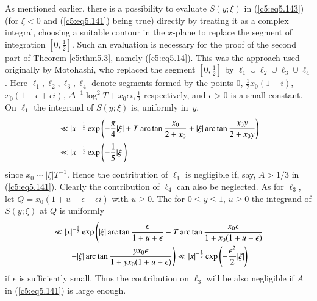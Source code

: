 As mentioned earlier, there is a possibility to evaluate $S(y;\xi)$ in
(\ref{c5:eq5.143}) (for $\xi < 0$ and (\ref{c5:eq5.141}) being true)
directly by treating it as a complex integral, choosing a suitable
contour in the $x$-plane to replace the segment of integration
$[0,\frac{1}{2}]$. Such an evaluation is necessary for the proof of
the second part of Theorem \ref{c5:thm5.3}, namely
(\ref{c5:eq5.14}). This was the approach used originally by Motohashi,
who replaced the segment $[0,\frac{1}{2}]$ by $\ell_1 \cup \ell_2 \cup
\ell_3 \cup \ell_4$. Here $\ell_1,\ell_2, \ell_3, \ell_4$ denote
segments formed by the points $0$, $\frac{1}{2} x_0 (1-i)$,
$x_0(1+\epsilon + \epsilon i)$, $\Delta^{-1} \log^2 T + x_0 \epsilon
i, \frac{1}{2}$ respectively, and $\epsilon > 0$ is a small
constant. On $\ell_1$ the integrand of $S(y;\xi)$ is, uniformly in~$y$, 
\begin{align*}
& \ll |x|^{-\frac{1}{2}} \exp \left( -\frac{\pi}{4} |\xi| + T \operatorname{arc}\tan
  \frac{x_0}{2+x_0} + |\xi| \operatorname{arc} \tan \frac{x_0 y}{2+x_0 y}
  \right)\\ 
&\ll |x|^{-\frac{1}{2}} \exp \left(-\frac{1}{5} |\xi| \right) 
\end{align*}\pageoriginale
since $x_0 \sim |\xi| T^{-1}$. Hence the contribution of $\ell_1$ is
negligible if, say, $A > 1/3$ in (\ref{c5:eq5.141}). Clearly the
contribution of $\ell_4$ can also be neglected. As for $\ell_3$, let
$Q = x_0(1+u+\epsilon + \epsilon i)$ with $u \geq 0$. The for $0 \leq
y \leq 1$, $u \geq 0$ the integrand of $S(y;\xi)$ at $Q$ is uniformly 
\begin{align}
& \ll |x|^{-\frac{1}{2}} \exp \left(|\xi| \operatorname{arc} \tan
  \frac{\epsilon}{1+u+\epsilon} - T \operatorname{arc} \tan \frac{x_0
    \epsilon}{1+x_0 (1+u+\epsilon)}  \right.\notag\\ 
& \qquad \left.  - |\xi| \operatorname{arc} \tan \frac{y x_0 \epsilon}{1+ y x_0
    (1+u+ \epsilon)} \right) 
\ll |x|^{-\frac{1}{2}} \exp \left(-\frac{\epsilon^2}{2} |\xi| \right)
\label{c5:eq5.152}
\end{align}
if $\epsilon$ is sufficiently small. Thus the contribution on $\ell_3$
will be also negligible if $A$ in (\ref{c5:eq5.141}) is large enough.  

